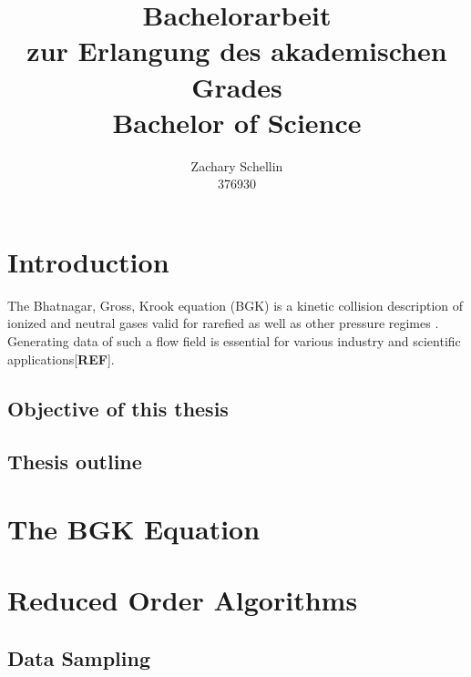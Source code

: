 \documentclass[12pt, a4paper]{article}
\begin{document}
\title{Bachelorarbeit\\ zur Erlangung des akademischen Grades\\ Bachelor of Science}
\author{Zachary Schellin\\376930}

\maketitle
\tableofcontents
\section{Introduction}
The Bhatnagar, Gross, Krook equation (BGK) is a kinetic collision description of ionized and neutral gases valid for rarefied as well as other pressure regimes \cite{BGK}. Generating data of such a flow field is essential for various industry and scientific applications[\textbf{REF}]. 
\subsection{Objective of this thesis}
\subsection{Thesis outline}
\section{The BGK Equation}
\section{Reduced Order Algorithms}
\subsection{Data Sampling}
\end{document}
